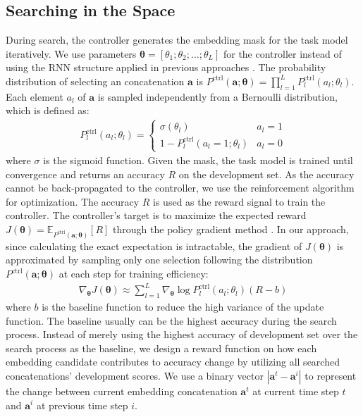 \documentclass[11pt,a4paper]{article}
\def\vtheta{{\bm{\theta}}}
\def\va{{\bm{a}}}
\def\eva{{a}}
\newcommand{\E}{\mathbb{E}}
\begin{document}
\subsection{Searching in the Space}
During search, the controller generates the embedding mask for the task model iteratively. We use parameters $\vtheta=[\theta_1;\theta_2;\dots;\theta_L]$ for the controller instead of using the RNN structure applied in previous approaches \citep{zoph2016neural,zoph2018learning}. The probability distribution of selecting an concatenation $\va$ is $P^{\text{ctrl}}(\va;\vtheta)=\prod_{l=1}^LP_l^{\text{ctrl}}(a_l;\theta_l)$. Each element $a_l$ of $\va$ is
sampled independently from a Bernoulli distribution,
which is defined as:
\begin{align}
P_l^{\text{ctrl}}(a_l;\theta_l) {=}
    \begin{cases}
    \sigma(\theta_l) &a_l{=}1\\
    1{-} P_l^{\text{ctrl}}(a_l{=}1;\theta_l) &a_l{=}0
    \end{cases}
    \label{eq:prob}
\end{align}
where $\sigma$ is the sigmoid function.
Given the mask, the task model is trained until convergence and returns an accuracy $R$ on the development set. 
As the accuracy cannot be back-propagated to the controller, we use the reinforcement algorithm for optimization. 
The accuracy $R$ is used as the reward signal to train the controller. 
The controller's target is to maximize the expected reward $J(\vtheta)=\E_{P^{\text{ctrl}}(\va;\vtheta)}[R]$ through the policy gradient method \citep{williams1992simple}.
In our approach, since calculating the exact expectation is intractable, the gradient of $J(\vtheta)$ is approximated by sampling only one selection following the distribution $P^{\text{ctrl}}(\va;\vtheta)$ at each step for training efficiency:
\begin{align}
\nabla_\vtheta J(\vtheta) \approx  \sum_{l=1}^L  \nabla_\vtheta \log P_l^{\text{ctrl}}(\eva_l;\theta_l) (R-b) \label{eq:rl}
\end{align} 
where $b$ is the baseline function to reduce the high variance of the update function. The baseline usually can be the highest accuracy during the search process. 
Instead of merely using the highest accuracy of development set over the search process as the baseline, we design a reward function on how each embedding candidate contributes to accuracy change by utilizing all searched concatenations' development scores.
We use a binary vector $|\va^t-\va^{i}|$ to represent the change between current embedding concatenation $\va^t$ at current time step $t$ and $\va^{i}$ at previous time step $i$.
\end{document}
